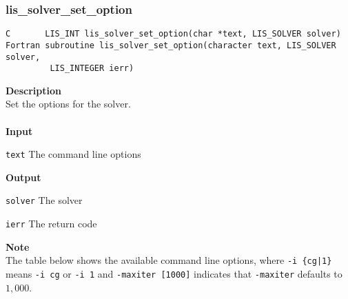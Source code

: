 \documentclass[a4paper]{article}
\newcommand{\namelistlabel}[1]{\mbox{#1}\hfill}
\newenvironment{namelist}[1]{%
\begin{list}{}
  {\let\makelabel\namelistlabel
  \settowidth{\labelwidth}{#1}
  \setlength{\leftmargin}{1.1\labelwidth}}
  }{%
\end{list}}
\begin{document}
\subsubsection{lis\_solver\_set\_option}
  \label{sec:setoptions}
\begin{screen}
\verb|C       LIS_INT lis_solver_set_option(char *text, LIS_SOLVER solver)|
\verb|Fortran subroutine lis_solver_set_option(character text, LIS_SOLVER solver,|\\
\verb|         LIS_INTEGER ierr)|
\end{screen}
{\bf Description}\\
\indent
Set the options for the solver.
\\ \\
\noindent
{\bf Input}
\begin{namelist}{XXXXXXXXXXXXXXXXXXXX}
\item[\tt text] The command line options
\end{namelist}
{\bf Output}
\begin{namelist}{XXXXXXXXXXXXXXXXXXXX}
\item[\tt solver] The solver
\item[\tt ierr] The return code
\end{namelist}
{\bf Note}\\
\indent
The table below shows the available command line options, 
where \verb=-i {cg|1}= means \verb=-i cg= or \verb=-i 1= and \verb=-maxiter [1000]= indicates 
that \verb=-maxiter= defaults to $1,000$.
\\
\\
\end{document}
